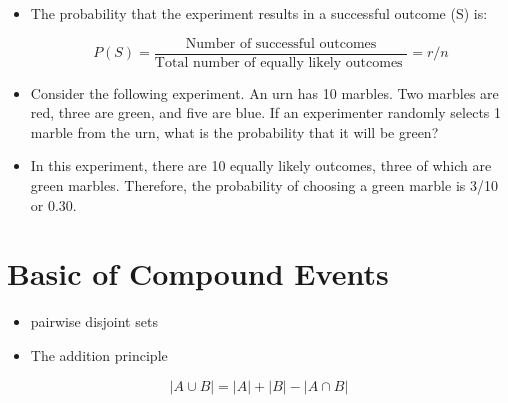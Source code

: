 \documentclass[]{report}
\begin{document}
{{\begin{itemize}
\item The probability that the experiment results in a successful outcome (S) is:

\[P(S) = \frac{\mbox{Number of successful outcomes} }{ \mbox{Total number of equally likely outcomes }} = r / n\]

\item Consider the following experiment. An urn has 10 marbles. Two marbles are red, three are green, and five are blue. If an experimenter randomly selects 1 marble from the urn, what is the probability that it will be green?

\item In this experiment, there are 10 equally likely outcomes, three of which are green marbles. Therefore, the probability of choosing a green marble is 3/10 or 0.30.
\end{itemize}




}






\section{Basic of Compound Events}

\begin{itemize}
\item pairwise disjoint sets
\item The addition principle
\end{itemize}
\[ |A \cup B| = |A| + |B| - |A \cap B|  \]




}
\end{document}
